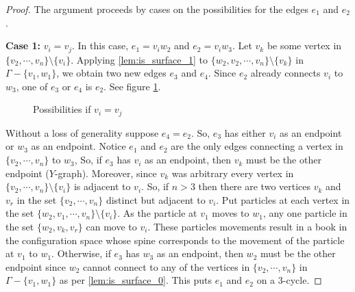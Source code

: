 \begin{proof}
    The argument proceeds by cases on the possibilities for the edges \(e_1\) and \(e_2\).
    
    \textbf{Case 1:} \(v_i = v_j\).
    In this case, \(e_1 = v_i w_2\) and \(e_2 = v_i w_3\). Let \(v_k\) be some vertex in \(\{v_2, \cdots, v_n\}\setminus\{v_i\}\).
    Applying \ref{lem:is_surface_1} to \(\{w_2, v_2, \cdots, v_n\}\setminus\{v_k\}\) in \(\Gamma - \{v_1, w_1\}\),
    we obtain two new edges \(e_3\) and \(e_4\).
    Since \(e_2\) already connects \(v_i\) to \(w_3\), one of \(e_3\) or \(e_4\) is \(e_2\). See figure \ref{fig:lem:is_surface_2_1}.
    \begin{figure}
        \centering
        \quad\quad
        \caption{Possibilities if \(v_i = v_j\)}
        \label{fig:lem:is_surface_2_1}
    \end{figure}
    Without a loss of generality suppose \(e_4 = e_2\).
    So, \(e_3\) has either \(v_i\) as an endpoint or \(w_3\) as an endpoint.
    Notice \(e_1\) and \(e_2\) are the only edges connecting a vertex in \(\{v_2, \cdots, v_n\}\) to \(w_3\),
    So, if \(e_3\) has \(v_i\) as an endpoint, then \(v_k\) must be the other endpoint (\(Y\)-graph).
    Moreover, since \(v_k\) was arbitrary every vertex in \(\{v_2, \cdots, v_n\}\setminus\{v_i\}\) is adjacent to \(v_i\).
    So, if \(n > 3\) then there are two vertices \(v_k\) and \(v_r\) in the set \(\{v_2, \cdots, v_n\}\) distinct but adjacent to \(v_i\).
    Put particles at each vertex in the set \(\{w_2, v_1, \cdots, v_n\}\setminus\{v_i\}\).
    As the particle at \(v_1\) moves to \(w_1\), any one particle in the set \(\{w_2, v_k, v_r\}\) can move to \(v_i\).
    These particles movements result in a book in the configuration space whose spine corresponds to the movement of the particle at \(v_1\) to \(w_1\).
    Otherwise, if \(e_3\) has \(w_3\) as an endpoint, then \(w_2\) must be the other endpoint since 
    \(w_2\) cannot connect to any of the vertices in \(\{v_2,\cdots, v_n\}\) in \(\Gamma - \{v_1, w_1\}\) as per \ref{lem:is_surface_0}.
    This puts \(e_1\) and \(e_2\) on a \(3\)-cycle.


\end{proof}
